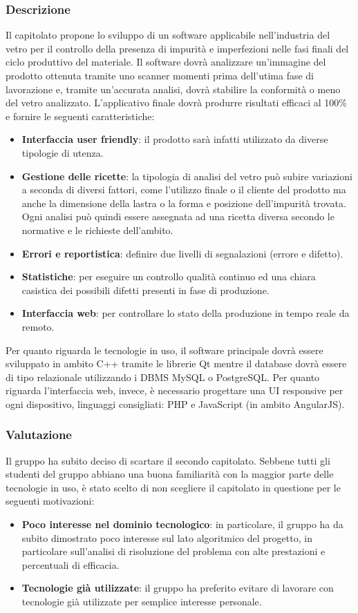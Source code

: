 \subsubsection{Descrizione}
Il capitolato propone lo sviluppo di un software applicabile nell'industria del vetro per il controllo della presenza di impurità e imperfezioni nelle fasi finali del ciclo produttivo del materiale. Il software dovrà analizzare un'immagine del prodotto ottenuta tramite uno scanner momenti prima dell'utima fase di lavorazione e, tramite un'accurata analisi, dovrà stabilire la conformità o meno del vetro analizzato. L'applicativo finale dovrà produrre risultati efficaci al 100\% e fornire le seguenti caratteristiche:
\begin{itemize}
\item \textbf{Interfaccia user friendly}: il prodotto sarà infatti utilizzato da diverse tipologie di utenza.
\item \textbf{Gestione delle ricette}: la tipologia di analisi del vetro può subire variazioni a seconda di diversi fattori, come l'utilizzo finale o il cliente del prodotto ma anche la dimensione della lastra o la forma e posizione dell'impurità trovata. Ogni analisi può quindi essere assegnata ad una ricetta diversa secondo le normative e le richieste dell'ambito.
\item \textbf{Errori e reportistica}: definire due livelli di segnalazioni (errore e difetto).
\item \textbf{Statistiche}: per eseguire un controllo qualità continuo ed una chiara casistica dei possibili difetti presenti in fase di produzione.
\item \textbf{Interfaccia web}: per controllare lo stato della produzione in tempo reale da remoto.
\end{itemize} 
Per quanto riguarda le tecnologie in uso, il software principale dovrà essere sviluppato in ambito C++ tramite le librerie Qt mentre il database dovrà essere di tipo relazionale utilizzando i DBMS MySQL o PostgreSQL. Per quanto riguarda l'interfaccia web, invece, è necessario progettare una UI responsive per ogni dispositivo, linguaggi consigliati: PHP e JavaScript (in ambito AngularJS). 

\subsubsection{Valutazione}
Il gruppo ha subito deciso di scartare il secondo capitolato. Sebbene tutti gli studenti del gruppo abbiano una buona familiarità con la maggior parte delle tecnologie in uso, è stato scelto di non scegliere il capitolato in questione per le seguenti motivazioni:
\begin{itemize}
\item \textbf{Poco interesse nel dominio tecnologico}: in particolare, il gruppo ha da subito dimostrato poco interesse sul lato algoritmico del progetto, in particolare sull'analisi di risoluzione del problema con alte prestazioni e percentuali di efficacia.
\item \textbf{Tecnologie già utilizzate}: il gruppo ha preferito evitare di lavorare con tecnologie già utilizzate per semplice interesse personale.
\end{itemize}

